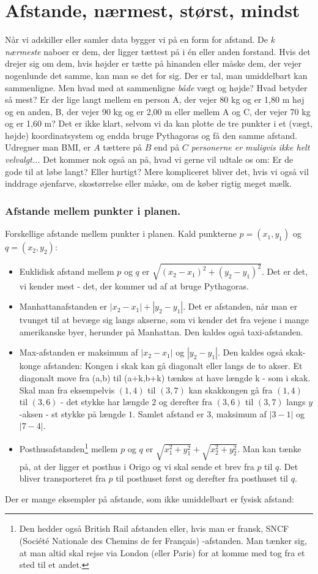 \documentclass[a4paper, 12pt]{article}
\theoremstyle{remark}
\begin{document}
\section*{Afstande, nærmest, størst, mindst}
Når vi adskiller eller samler data bygger vi på en form for afstand. De $k$ \emph{ nærmeste} naboer er dem, der ligger tættest på i én eller anden forstand. 
Hvis det drejer sig om dem, hvis højder er tætte på hinanden eller måske dem, der vejer nogenlunde det samme, kan man se det for sig. 
Der er tal, man umiddelbart kan sammenligne. Men hvad med at sammenligne \emph{både} vægt og højde? Hvad betyder så mest? 
Er der lige langt mellem en person A, der vejer 80 kg og er 1,80 m høj og en anden, B,  der vejer 90 kg og er 2,00 m eller mellem A og C, der vejer 70 kg og er 1,60 m? 
Det er ikke klart, selvom vi da kan plotte de tre punkter i et (vægt, højde) koordinatsystem og endda bruge Pythagoras og få den samme afstand. 
Udregner man BMI, er $A$ tættere på $B$ end på $C$  \emph{personerne er muligvis ikke helt velvalgt...}
Det kommer nok også an på, hvad vi gerne vil udtale os om: Er de gode til at løbe langt? Eller hurtigt? Mere kompliceret bliver det, hvis vi også vil inddrage øjenfarve, skostørrelse eller måske, om de køber rigtig meget mælk.
\subsubsection*{Afstande mellem punkter i planen.}
Forskellige afstande mellem punkter i planen. Kald punkterne $p=(x_1,y_1)$ og $q=(x_2,y_2)$: 
\begin{itemize}
\item Euklidisk afstand mellem $p$ og $q$ er $\sqrt{(x_2-x_1)^2+(y_2-y_1)^2}$. Det er det, vi kender mest - det, der kommer ud af at bruge Pythagoras.
\item Manhattanafstanden er $|x_2-x_1|+|y_2-y_1|$. Det er afstanden, når man er tvunget til at bevæge sig langs akserne, som vi kender det fra vejene i mange amerikanske byer, herunder på Manhattan. Den kaldes også taxi-afstanden. 
\item Max-afstanden er maksimum af   $|x_2-x_1|$ og $|y_2-y_1|$. Den kaldes også skak-konge afstanden: Kongen i skak kan gå diagonalt eller langs de to akser. Et diagonalt move fra (a,b) til (a+k,b+k) tænkes at have længde k - som i skak. Skal man fra eksempelvis $(1,4)$ til $(3,7)$ kan skakkongen gå fra $(1,4)$ til $(3,6)$ - det stykke har længde $2$ og derefter fra $(3,6)$ til $(3,7)$ langs $y$-aksen - st stykke på længde $1$. Samlet afstand er $3$, maksimum af $|3-1|$ og $|7-4|$. 
\item Posthusafstanden\footnote{Den hedder også British Rail afstanden eller, hvis man er fransk, SNCF (Société Nationale des Chemins de fer Fran\c{c}ais) -afstanden. Man tænker sig, at man altid skal rejse via London (eller Paris) for at komme med tog fra et sted til et andet.} mellem $p$ og $q$ er $\sqrt{x_1^2+y_1^2}+\sqrt{x_2^2+y_2^2}$. Man kan tænke på, at der ligger et posthus i Origo og vi skal sende et brev fra $p$ til $q$. Det bliver transporteret fra $p$  til posthuset først og derefter fra posthuset til $q$.
\end{itemize}
Der er mange eksempler på afstande, som ikke umiddelbart er fysisk afstand:
\end{document}
